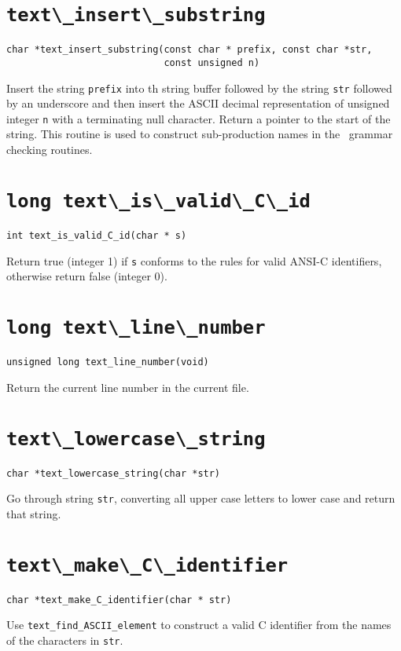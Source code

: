 \section{\protect\verb+text\_insert\_substring+}
\begin{verbatim}
char *text_insert_substring(const char * prefix, const char *str, 
                            const unsigned n)
\end{verbatim}
Insert the string {\tt prefix} into th string buffer
followed by the string {\tt str} followed by an
underscore and then insert the ASCII decimal representation of unsigned
integer \verb+n+ with a terminating null character.  Return a pointer to
the start of the string. This routine is used to construct
sub-production names in the \rdp\ grammar checking routines.

\section{\protect\verb+long text\_is\_valid\_C\_id+}
\begin{verbatim}
int text_is_valid_C_id(char * s)
\end{verbatim}
Return {\sc true} (integer 1) if {\tt s} conforms to the rules for
valid ANSI-C identifiers, otherwise return {\sc false} (integer 0).

\section{\protect\verb+long text\_line\_number+}
\begin{verbatim}
unsigned long text_line_number(void)
\end{verbatim}
Return the current line number in the current file.

\section{\protect\verb+text\_lowercase\_string+}
\begin{verbatim}
char *text_lowercase_string(char *str)
\end{verbatim}
Go through string {\tt str}, converting all upper case letters to lower
case and return that string.

\section{\protect\verb+text\_make\_C\_identifier+}
\begin{verbatim}
char *text_make_C_identifier(char * str)
\end{verbatim}
Use \verb+text_find_ASCII_element+ to construct a valid C identifier from
the names of the characters in {\tt str}.

